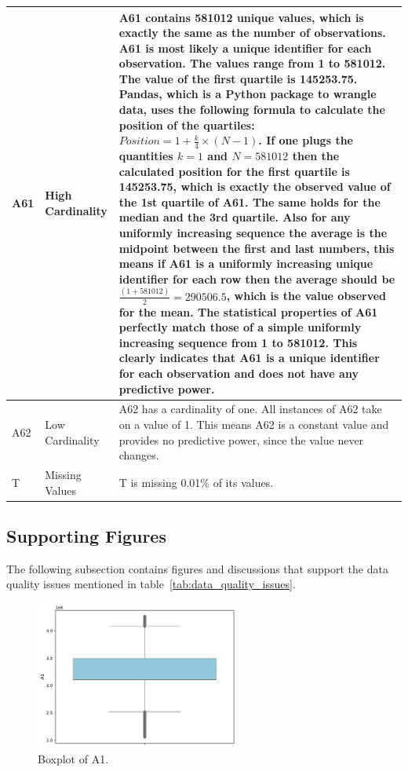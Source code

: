 \documentclass[11pt]{report}
\begin{document}
\begin{longtable}{lp{5cm}p{8cm}}
A61 & High Cardinality & A61 contains 581012 unique values, which is exactly the same as the number of observations. A61 is most likely a unique identifier for each observation. The values range from 1 to 581012. The value of the first quartile is 145253.75. Pandas, which is a Python package to wrangle data, uses the following formula to calculate the position of the quartiles: $Position = 1 + \frac{k}{4} \times (N - 1)$. If one plugs the quantities $k = 1$ and $N = 581012$ then the calculated position for the first quartile is 145253.75, which is exactly the observed value of the 1st quartile of A61. The same holds for the median and the 3rd quartile. Also for any uniformly increasing sequence the average is the midpoint between the first and last numbers, this means if A61 is a uniformly increasing unique identifier for each row then the average should be $\frac{(1 + 581012)}{2} = 290506.5$, which is the value observed for the mean. The statistical properties of A61 perfectly match those of a simple uniformly increasing sequence from 1 to 581012. This clearly indicates that A61 is a unique identifier for each observation and does not have any predictive power. \\
\midrule
A62 & Low Cardinality & A62 has a cardinality of one. All instances of A62 take on a value of 1. This means A62 is a constant value and provides no predictive power, since the value never changes. \\
\midrule
T & Missing Values & T is missing 0.01\% of its values. \\
\end{longtable}


\subsection*{Supporting Figures}

The following subsection contains figures and discussions that support the data quality issues mentioned in table~\ref{tab:data_quality_issues}.

\begin{figure}[H]
    \centering
    \includegraphics[width=0.6\textwidth]{images/A1_boxplot.pdf}
    \caption{Boxplot of A1.}
    \label{fig:a1_boxplot}
\end{figure}
\end{document}
